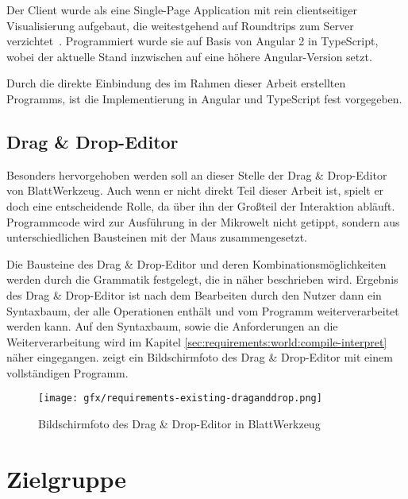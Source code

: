 Der Client wurde als eine Single-Page Application mit rein clientseitiger Visualisierung aufgebaut, die weitestgehend auf Roundtrips zum Server verzichtet~\cite[94-95]{riemer2016}. Programmiert wurde sie auf Basis von Angular 2 in TypeScript, wobei der aktuelle Stand inzwischen auf eine höhere Angular-Version setzt.

Durch die direkte Einbindung des im Rahmen dieser Arbeit erstellten Programms, ist die Implementierung in Angular und TypeScript fest vorgegeben.

\subsection{Drag \& Drop-Editor}
\label{sec:requirements:existing:structure:drag-drop}

Besonders hervorgehoben werden soll an dieser Stelle der Drag \& Drop-Editor von BlattWerkzeug. Auch wenn er nicht direkt Teil dieser Arbeit ist, spielt er doch eine entscheidende Rolle, da über ihn der Großteil der Interaktion abläuft. Programmcode wird zur Ausführung in der Mikrowelt nicht getippt, sondern aus unterschiedlichen Bausteinen mit der Maus zusammengesetzt.

Die Bausteine des Drag \& Drop-Editor und deren Kombinationsmöglichkeiten werden durch die Grammatik festgelegt, die in  näher beschrieben wird. Ergebnis des Drag \& Drop-Editor ist nach dem Bearbeiten durch den Nutzer dann ein Syntaxbaum, der alle Operationen enthält und vom Programm weiterverarbeitet werden kann. Auf den Syntaxbaum, sowie die Anforderungen an die Weiterverarbeitung wird im Kapitel \ref{sec:requirements:world:compile-interpret} näher eingegangen.  zeigt ein Bildschirmfoto des Drag \& Drop-Editor mit einem vollständigen Programm.

\begin{figure}
    \centering
    \texttt{[image: gfx/requirements-existing-draganddrop.png]}
    \caption{Bildschirmfoto des Drag \& Drop-Editor in BlattWerkzeug}
    \label{fig:requirements:existing:draganddrop}
\end{figure}

\section{Zielgruppe}
\label{sec:requirements:target}

